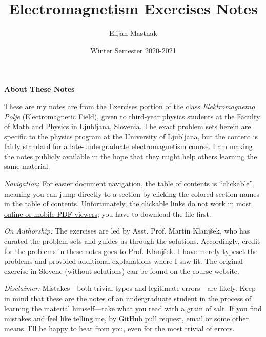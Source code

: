 \documentclass[11pt, a4paper]{article}
\begin{document}
\title{Electromagnetism Exercises Notes}
\author{Elijan Mastnak}
\date{Winter Semester 2020-2021}
\maketitle

\begin{center}
\textbf{About These Notes}
\end{center}
These are my notes are from the Exercises portion of the class \textit{Elektromagnetno Polje} (Electromagnetic Field), given to third-year physics students at the Faculty of Math and Physics in Ljubljana, Slovenia. The exact problem sets herein are specific to the physics program at the University of Ljubljana, but the content is fairly standard for a late-undergraduate electromagnetism course. I am making the notes publicly available in the hope that they might help others learning the same material.

\vspace{2mm}
\textit{Navigation}: For easier document navigation, the table of contents is ``clickable'', meaning you can jump directly to a section by clicking the colored section names in the table of contents. Unfortunately, \uline{the clickable links do not work in most online or mobile PDF viewers}; you have to download the file first.

\vspace{2mm}
\textit{On Authorship:} 
The exercises are led by Asst. Prof. Martin Klanj\v{s}ek, who has curated the problem sets and guides us through the solutions. Accordingly, credit for the problems in these notes goes to Prof. Klanj\v{s}ek. I have merely typeset the problems and provided additional explanations where I saw fit. The original exercise in Slovene (without solutions) can be found on the \href{https://www-f5.ijs.si/emp-2020-2021.html}{\underline{course website}}. 

\vspace{2mm}
\textit{Disclaimer:} Mistakes---both trivial typos and legitimate errors---are likely. Keep in mind that these are the notes of an undergraduate student in the process of learning the material himself---take what you read with a grain of salt. If you find mistakes and feel like telling me, by \href{https://github.com/ejmastnak/fmf}{\underline{GitHub}} pull request, \href{mailto:ejmastnak@gmail.com}{\underline{email}} or some other means, I'll be happy to hear from you, even for the most trivial of errors.
\end{document}
